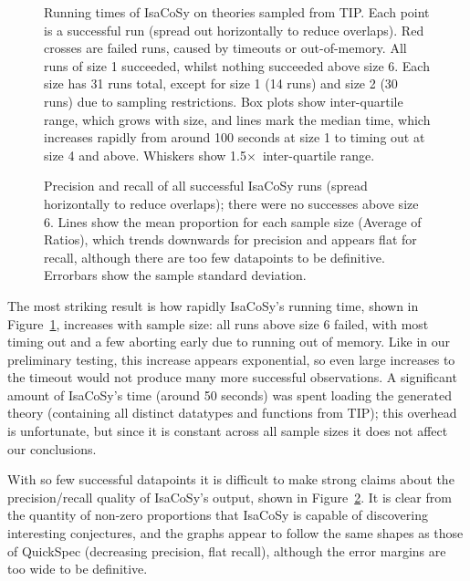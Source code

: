 \begin{figure}
  \centering
  
  \caption{Running times of IsaCoSy on theories sampled from TIP. Each point
    is a successful run (spread out horizontally to reduce overlaps). Red
    crosses are failed runs, caused by timeouts or out-of-memory. All runs of
    size 1 succeeded, whilst nothing succeeded above size 6. Each size has 31
    runs total, except for size 1 (14 runs) and size 2 (30 runs) due to sampling
    restrictions. Box plots show inter-quartile range, which grows with size,
    and lines mark the median time, which increases rapidly from around 100
    seconds at size 1 to timing out at size 4 and above. Whiskers show
    1.5$\times$~inter-quartile range.}
  \label{figure:isacosy_runtimes}
\end{figure}

\begin{figure}
  \centering
  
  \caption{Precision and recall of all successful IsaCoSy runs (spread
    horizontally to reduce overlaps); there were no successes above size 6.
    Lines show the mean proportion for each sample size (Average of Ratios),
    which trends downwards for precision and appears flat for recall, although
    there are too few datapoints to be definitive. Errorbars show the sample
    standard deviation.}
  \label{figure:isacosy_precRec}
\end{figure}

The most striking result is how rapidly IsaCoSy's running time, shown in
Figure~\ref{figure:isacosy_runtimes}, increases with sample size: all runs above
size 6 failed, with most timing out and a few aborting early due to running out
of memory. Like in our preliminary testing, this increase appears exponential,
so even large increases to the timeout would not produce many more successful
observations. A significant amount of IsaCoSy's time (around 50 seconds) was
spent loading the generated theory (containing all distinct datatypes and
functions from TIP); this overhead is unfortunate, but since it is constant
across all sample sizes it does not affect our conclusions.

With so few successful datapoints it is difficult to make strong claims about
the precision/recall quality of IsaCoSy's output, shown in
Figure~\ref{figure:isacosy_precRec}. It is clear from the quantity of non-zero
proportions that IsaCoSy is capable of discovering interesting conjectures, and
the graphs appear to follow the same shapes as those of QuickSpec (decreasing
precision, flat recall), although the error margins are too wide to be
definitive.

